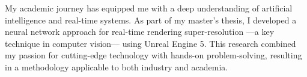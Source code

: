 My academic journey has equipped me with a deep understanding of artificial intelligence 
and real-time systems. As part of my master’s thesis, 
I developed a neural network approach for real-time rendering super-resolution —a key technique in computer vision— using Unreal Engine 5. 
This research combined my passion for cutting-edge technology with hands-on problem-solving, 
resulting in a methodology applicable to both industry and academia.